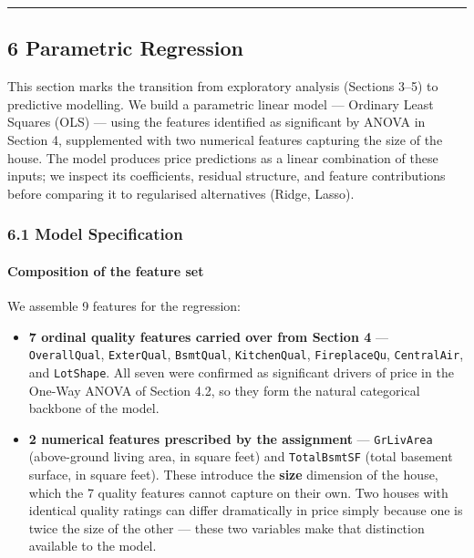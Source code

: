 \begin{center}\rule{0.5\linewidth}{0.5pt}\end{center}

\subsection{6 Parametric Regression}\label{parametric-regression}

This section marks the transition from exploratory analysis (Sections
3--5) to predictive modelling. We build a parametric linear model ---
Ordinary Least Squares (OLS) --- using the features identified as
significant by ANOVA in Section 4, supplemented with two numerical
features capturing the size of the house. The model produces price
predictions as a linear combination of these inputs; we inspect its
coefficients, residual structure, and feature contributions before
comparing it to regularised alternatives (Ridge, Lasso).

\subsubsection{6.1 Model Specification}\label{model-specification}

\paragraph{Composition of the feature
set}\label{composition-of-the-feature-set}

We assemble 9 features for the regression:

\begin{itemize}
\tightlist
\item
  \textbf{7 ordinal quality features carried over from Section 4} ---
  \texttt{OverallQual}, \texttt{ExterQual}, \texttt{BsmtQual},
  \texttt{KitchenQual}, \texttt{FireplaceQu}, \texttt{CentralAir}, and
  \texttt{LotShape}. All seven were confirmed as significant drivers of
  price in the One-Way ANOVA of Section 4.2, so they form the natural
  categorical backbone of the model.
\item
  \textbf{2 numerical features prescribed by the assignment} ---
  \texttt{GrLivArea} (above-ground living area, in square feet) and
  \texttt{TotalBsmtSF} (total basement surface, in square feet). These
  introduce the \textbf{size} dimension of the house, which the 7
  quality features cannot capture on their own. Two houses with
  identical quality ratings can differ dramatically in price simply
  because one is twice the size of the other --- these two variables
  make that distinction available to the model.
\end{itemize}

